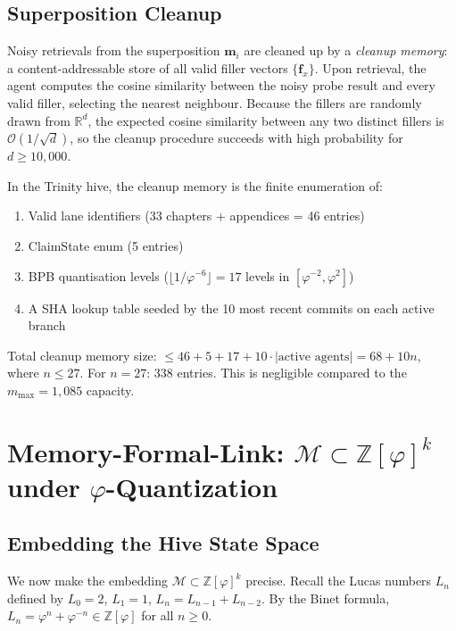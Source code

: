\subsection{Superposition Cleanup}
\label{ssec:K-cleanup}

Noisy retrievals from the superposition $\mathbf{m}_i$ are cleaned up
by a \emph{cleanup memory}: a content-addressable store of all valid
filler vectors $\{\mathbf{f}_x\}$. Upon retrieval, the agent computes
the cosine similarity between the noisy probe result and every valid
filler, selecting the nearest neighbour. Because the fillers are
randomly drawn from $\mathbb{R}^d$, the expected cosine similarity
between any two distinct fillers is $\mathcal{O}(1/\sqrt{d})$, so the
cleanup procedure succeeds with high probability for $d \geq 10{,}000$.

In the Trinity hive, the cleanup memory is the finite enumeration of:
\begin{enumerate}
  \item Valid lane identifiers (33 chapters + appendices = 46 entries)
  \item ClaimState enum (5 entries)
  \item BPB quantisation levels ($\lfloor 1/\varphi^{-6} \rfloor = 17$
        levels in $[\varphi^{-2}, \varphi^{2}]$)
  \item A SHA lookup table seeded by the 10 most recent commits on each
        active branch
\end{enumerate}
Total cleanup memory size: $\leq 46 + 5 + 17 + 10 \cdot |\text{active agents}|
= 68 + 10n$, where $n \leq 27$. For $n = 27$: 338 entries. This is
negligible compared to the $m_{\max} = 1{,}085$ capacity.


\section{Memory-Formal-Link: $\mathcal{M} \subset \mathbb{Z}[\varphi]^{k}$
  under $\varphi$-Quantization}
\label{sec:K-formal-link}

\subsection{Embedding the Hive State Space}
\label{ssec:K-embedding}

We now make the embedding $\mathcal{M} \subset \mathbb{Z}[\varphi]^{k}$
precise. Recall the Lucas numbers $L_n$ defined by $L_0 = 2$,
$L_1 = 1$, $L_n = L_{n-1} + L_{n-2}$. By the Binet formula,
$L_n = \varphi^n + \varphi^{-n} \in \mathbb{Z}[\varphi]$ for all
$n \geq 0$.

